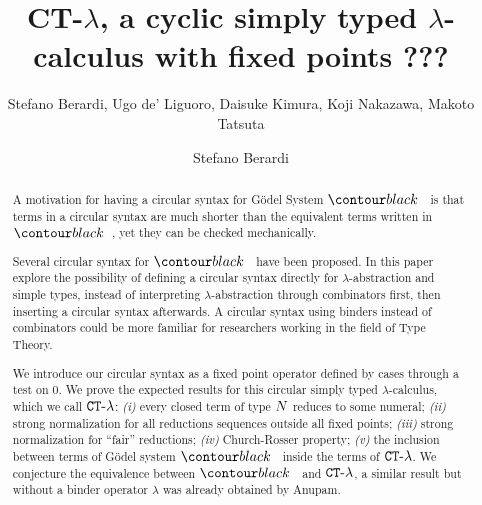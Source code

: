 \ifdraft

\title{CT-$\lambda$, a cyclic simply typed $\lambda$-calculus with fixed points}

\author{Stefano Berardi,  Ugo de' Liguoro, Daisuke Kimura, Koji Nakazawa, Makoto Tatsuta}
\date{}

\else

\title[Equivalence]
{
???
}

\author[S. Berardi]{Stefano Berardi}
\address{Universit\`{a} di Torino,
Torino, Italy}


\fi

\maketitle

\begin{abstract}
A motivation for having a circular syntax for G\"{o}del System $\systemT$ is that terms 
in a circular syntax are much shorter than the equivalent terms written in $\systemT$, 
yet they can be checked mechanically.

Several circular syntax for $\systemT$ have been proposed.
In this paper explore the possibility of defining a circular syntax
directly for $\lambda$-abstraction and simple types, instead of interpreting
 $\lambda$-abstraction through combinators first, then inserting a  circular syntax afterwards.
A circular syntax using binders instead of combinators
could be more familiar for researchers working in the field of Type Theory.

We introduce our circular syntax as a fixed point operator defined by cases through a test on $0$.
We prove the expected results for this circular simply typed $\lambda$-calculus, which we call ${ {\tt CT} \mbox{-} \lambda}$: 
\emph{(i)} every closed term of type ${N}$ reduces to some numeral;
\emph{(ii)}  strong normalization for all reductions sequences outside all fixed points; 
\emph{(iii)}  strong normalization for ``fair'' reductions; \emph{(iv)} Church-Rosser property;
\emph{(v)} the inclusion between terms of G\"{o}del system $\systemT$
inside the terms of ${ {\tt CT} \mbox{-} \lambda}$. 
We conjecture the equivalence between $\systemT$ and ${ {\tt CT} \mbox{-} \lambda}$,
a similar result but without a binder operator $\lambda$ was already obtained by Anupam.

\end{abstract}

\iffalse
key words: 
proof theory,
inductive definitions,
Brotherston-Simpson conjecture,
cyclic proofs,
Martin-Lof's system of inductive definitions,
infinite Ramsey theorem
Podelski-Rybalchenko termination theorem
size-change termination theorem
\fi
